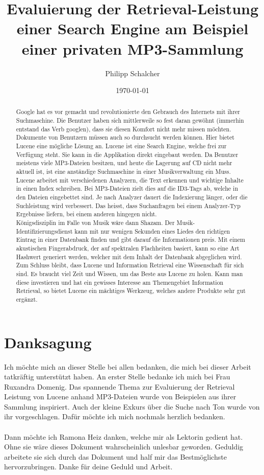 \documentclass[12pt,a4paper,ngerman]{report}
\author{Philipp Schalcher}
\title{Evaluierung der Retrieval-Leistung einer Search Engine am Beispiel einer privaten MP3-Sammlung}
\date{\today}
\begin{document}

\chapter*{Danksagung}
Ich möchte mich an dieser Stelle bei allen bedanken, die mich bei dieser Arbeit tatkräftig
unterstützt haben.
An erster Stelle bedanke ich mich bei Frau Ruxandra Domenig. Das spannende Thema zur Evaluierung der Retrieval Leistung von Lucene anhand MP3-Dateien wurde von Beispielen aus ihrer Sammlung inspiriert. Auch der kleine Exkurs über die Suche nach Ton wurde von ihr vorgeschlagen. Dafür möchte ich mich nochmals herzlich bedanken.\\
\\
Dann möchte ich Ramona Heiz danken, welche mir als Lektorin gedient hat. Ohne sie wäre dieses Dokument wahrscheinlich unlesbar geworden. Geduldig arbeitete sie sich durch das Dokument und half mir das Bestmöglichste hervorzubringen. Danke für deine Geduld und Arbeit.
\tableofcontents
\begin{abstract}
Google hat es vor gemacht und revolutionierte den Gebrauch des Internets mit ihrer Suchmaschine. Die Benutzer haben sich mittlerweile so fest daran gewöhnt (immerhin entstand das Verb googlen), dass sie diesen Komfort nicht mehr missen möchten.\\
Dokumente von Benutzern müssen auch so durchsucht werden können. Hier bietet Lucene eine mögliche Lösung an. Lucene ist eine Search Engine, welche frei zur Verfügung steht. Sie kann in die Applikation direkt eingebaut werden. Da Benutzer meistens viele MP3-Dateien besitzen, und heute die Lagerung auf CD nicht mehr aktuell ist, ist eine anständige Suchmaschine in einer Musikverwaltung ein Muss. Lucene arbeitet mit verschiedenen Analyzern, die Text erkennen und wichtige Inhalte in einen Index schreiben. Bei MP3-Dateien zielt dies auf die ID3-Tags ab, welche in den Dateien eingebettet sind. Je nach Analyzer dauert die Indexierung länger, oder die Suchleistung wird verbessert. Das heisst, dass Suchanfragen bei einem Analyzer-Typ Ergebnisse liefern, bei einem anderen hingegen nicht.\\
Königsdisziplin im Falle von Musik wäre dann Shazam. Der Musik-Identifizierungsdienst kann mit nur wenigen Sekunden eines Liedes den richtigen Eintrag in einer Datenbank finden und gibt darauf die Informationen preis. Mit einem akustischen Fingerabdruck, der auf spektralen Flachheiten basiert, kann so eine Art Hashwert generiert werden, welcher mit dem Inhalt der Datenbank abgeglichen wird.\\
Zum Schluss bleibt, dass Lucene und Information Retrieval eine Wissenschaft für sich sind. Es braucht viel Zeit und Wissen, um das Beste aus Lucene zu holen. Kann man diese investieren und hat ein gewisses Interesse am Themengebiet Information Retrieval, so bietet Lucene ein mächtiges Werkzeug, welches andere Produkte sehr gut ergänzt.
\end{abstract}
\end{document}
